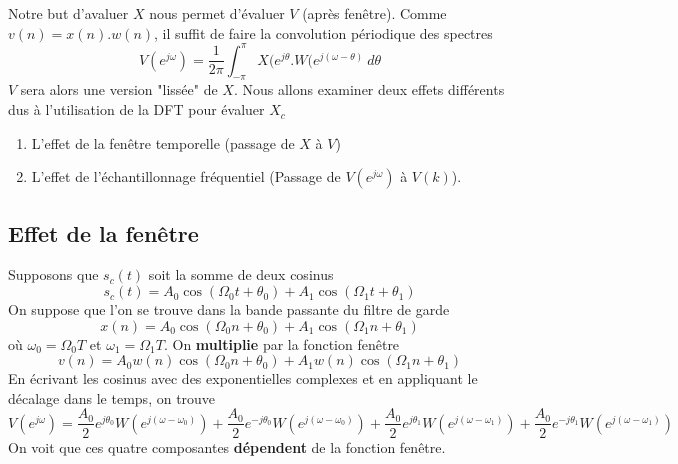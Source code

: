	Notre but d'avaluer $X$ nous permet d'évaluer $V$ (après fenêtre). Comme $v(n)=x(n).w(n)$, il suffit 
	de faire la convolution périodique des spectres
	\begin{equation}
	V(e^{j\omega}) = \dfrac{1}{2\pi}\int_{-\pi}^\pi X(e^{j\theta}.W(e^{j(\omega-\theta)}\ d\theta
	\end{equation}
	$V$ sera alors une version "lissée" de $X$. Nous allons examiner deux effets différents dus à 
	l'utilisation de la DFT pour évaluer $X_c$
	\begin{enumerate}
	\item L'effet de la fenêtre temporelle (passage de $X$ à $V$)
	\item L'effet de l’échantillonnage fréquentiel (Passage de $V(e^{j\omega})$ à $V(k)$).
	\end{enumerate}
		
		\subsection{Effet de la fenêtre}
		Supposons que $s_c(t)$ soit la somme de deux cosinus
		\begin{equation}
		s_c(t) = A_0\cos(\Omega_0t+\theta_0)+A_1\cos(\Omega_1t+\theta_1)
		\end{equation}
		On suppose que l'on se trouve dans la bande passante du filtre de garde
		\begin{equation}
		x(n) = A_0\cos(\Omega_0n+\theta_0)+A_1\cos(\Omega_1n+\theta_1)
		\end{equation}		
		où $\omega_0=\Omega_0T$ et $\omega_1 = \Omega_1T$. On \textbf{multiplie} par la fonction 
		fenêtre
		\begin{equation}
		v(n) = A_0w(n)\cos(\Omega_0n+\theta_0)+A_1w(n)\cos(\Omega_1n+\theta_1)
		\end{equation}
		En écrivant les cosinus avec des exponentielles complexes et en appliquant le décalage 
		dans le temps, on trouve
		\begin{equation}
		V(e^{j\omega}) = \frac{A_0}{2}e^{j\theta_0}W(e^{j(\omega-\omega_0)})+
		\frac{A_0}{2}e^{-j\theta_0}W(e^{j(\omega-\omega_0)})+
		\frac{A_0}{2}e^{j\theta_1}W(e^{j(\omega-\omega_1)})+
		\frac{A_0}{2}e^{-j\theta_1}W(e^{j(\omega-\omega_1)})
		\end{equation}
		On voit que ces quatre composantes \textbf{dépendent} de la fonction fenêtre.\\
		
